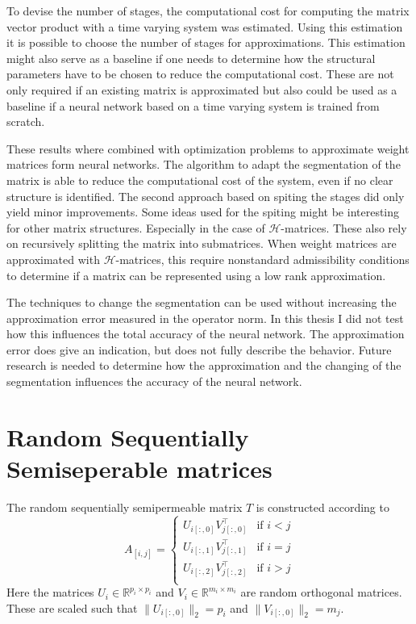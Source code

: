 \documentclass[doctype=mastersthesis,BCOR=15mm,biblatex]{ldvbook}%
\begin{document}
To devise the number of stages, the computational cost for computing the matrix vector product with a time varying system was estimated.
Using this estimation it is possible to choose the number of stages for approximations.
This estimation might also serve as a baseline if one needs to determine how the structural parameters have to be chosen to reduce the computational cost.
These are not only required if an existing matrix is approximated but also could be used as a baseline if a neural network based on a time varying system is trained from scratch.

These results where combined with optimization problems to approximate weight matrices form neural networks.
The algorithm to adapt the segmentation of the matrix is able to reduce the computational cost of the system, even if no clear structure is identified.
The second approach based on spiting the stages did only yield minor improvements.
Some ideas used for the spiting might be interesting for other matrix structures.
Especially in the case of $\mathcal{H}$-matrices.
These also rely on recursively splitting the matrix into submatrices.
When weight matrices are approximated with $\mathcal{H}$-matrices, this require nonstandard admissibility conditions to determine if a matrix can be represented using a low rank approximation.

The techniques to change the segmentation can be used without increasing the approximation error measured in the operator norm.
In this thesis I did not test how this influences the total accuracy of the neural network. 
The approximation error does give an indication, but does not fully describe the behavior.
Future research is needed to determine how the approximation and the changing of the segmentation influences the accuracy of the neural network.


\appendix
\chapter{Random Sequentially Semiseperable matrices}\label{A:random_T}


The random sequentially semipermeable matrix $T$ is constructed according to
\begin{equation}
	A_{[i,j]} = 
	\begin{cases}
	U_{i[:,0]} V_{j[:,0]}^\top & \text{if } i<j\\
	U_{i[:,1]} V_{j[:,1]}^\top & \text{if } i=j\\
	U_{i[:,2]} V_{j[:,2]}^\top & \text{if } i>j\\
	\end{cases}
\end{equation}
Here the matrices $U_i \in \mathbb{R}^{p_i\times p_i}$ and $V_i \in \mathbb{R}^{m_i\times m_i}$ are random orthogonal matrices. 
These are scaled such that $\|U_{i[:,0]}\|_2=p_i$ and $\|V_{i[:,0]}\|_2=m_j$.

\printbibliography{}
\end{document}
